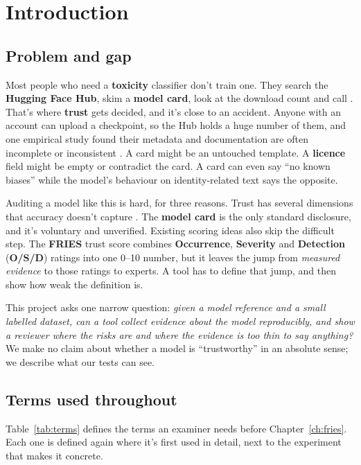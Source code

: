 \chapter{Introduction}\label{ch:intro}

\section{Problem and gap}
Most people who need a \textbf{toxicity} classifier don't train one. They search the \textbf{Hugging Face Hub}, skim a \textbf{model card}, look at the download count and call . That's where \textbf{trust} gets decided, and it's close to an accident. Anyone with an account can upload a checkpoint, so the Hub holds a huge number of them, and one empirical study found their metadata and documentation are often incomplete or inconsistent \cite{jiang2023reuse}. A card might be an untouched template. A \textbf{licence} field might be empty or contradict the card. A card can even say ``no known biases'' while the model's behaviour on identity-related text says the opposite.

Auditing a model like this is hard, for three reasons. Trust has several dimensions that accuracy doesn't capture \cite{kemmerzell2025,mattioli2024}. The \textbf{model card} is the only standard disclosure, and it's voluntary and unverified. Existing scoring ideas also skip the difficult step. The \textbf{FRIES} trust score \cite{rutinowski2024} combines \textbf{Occurrence}, \textbf{Severity} and \textbf{Detection} (\textbf{O/S/D}) ratings into one 0--10 number, but it leaves the jump from \emph{measured evidence} to those ratings to experts. A tool has to define that jump, and then show how weak the definition is.

This project asks one narrow question: \emph{given a model reference and a small labelled dataset, can a tool collect evidence about the model reproducibly, and show a reviewer where the risks are and where the evidence is too thin to say anything?} We make no claim about whether a model is ``trustworthy'' in an absolute sense; we describe what our tests can see.

\section{Terms used throughout}\label{sec:terms}
Table~\ref{tab:terms} defines the terms an examiner needs before Chapter~\ref{ch:fries}. Each one is defined again where it's first used in detail, next to the experiment that makes it concrete.

